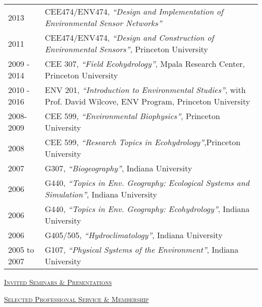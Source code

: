 \documentclass[10pt]{article}
\begin{document}
\begin{longtable}{l p{5.5in}}
2013 & CEE474/ENV474, \emph{``Design and Implementation of Environmental Sensor Networks''} \\
2011 & CEE474/ENV474, \emph{``Design and Construction of Environmental Sensors''}, Princeton University \\
2009 - 2014 & CEE 307, \emph{``Field Ecohydrology''}, Mpala Research Center, Princeton University \\
2010 - 2016 & ENV 201, \emph{``Introduction to Environmental Studies''}, with Prof. David Wilcove, ENV Program, Princeton University \\
2008-2009 & CEE 599, \emph{``Environmental Biophysics''}, Princeton University \\ 
2008 & CEE 599, \emph{``Research Topics in Ecohydrology''},Princeton University \\
2007 & G307, \emph{``Biogeography''}, Indiana University\\
2006 & G440, \emph{``Topics in Env. Geography: Ecological Systems and Simulation''}, Indiana University \\
2006 & G440, \emph{``Topics in Env. Geography: Ecohydrology''}, Indiana University \\
2006 & G405/505, \emph{``Hydroclimatology''}, Indiana University \\
2005 to 2007 & G107, \emph{``Physical Systems of the Environment''}, Indiana University  \\ 
\end{longtable}

\vspace{0.1in}

\textsc{\underline{Invited Seminars \& Presentations}}



\textsc{\underline{Selected Professional Service \& Membership}}
\end{document}

